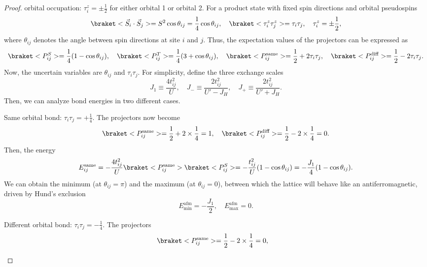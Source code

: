 \begin{solution}
\begin{enumext}[label = \Roman*.]
\begin{proof}
      orbital occupation: $\tau_i^z = \pm\frac12$ for either orbital 1 or
      orbital 2. For a product state with fixed spin directions and
      orbital pseudospins
      \[
        \braket<\vec S_i \cdot \vec S_j> = S^2 \cos\theta_{ij}
      = \frac14 \cos\theta_{ij}, \quad
        \braket<\tau_i^z \tau_j^z> = \tau_i \tau_j, \quad \tau_i^z = \pm\frac12,
      \]
      where $\theta_{ij}$ denotes the angle between spin directions at site $i$
      and $j$. Thus, the expectation values of the projectors can be
      expressed as
      \[
        \braket<P_{ij}^S> = \frac14(1 - \cos\theta_{ij}), \quad
        \braket<P_{ij}^T> = \frac14(3 + \cos\theta_{ij}), \quad
        \braket<P_{ij}^\text{same}> = \frac12 + 2\tau_i\tau_j,\quad
        \braket<P_{ij}^\text{diff}> = \frac12 - 2\tau_i\tau_j.
      \]
      Now, the uncertain variables are $\theta_{ij}$ and $\tau_i\tau_j$.
      For simplicity, define the three exchange scales
      \[
        J_1 \equiv \frac{4t_{ij}^2}{U}, \quad
        J_- \equiv \frac{2t_{ij}^2}{U' - J_H}, \quad
        J_+ \equiv \frac{2t_{ij}^2}{U' + J_H}.
      \]
      Then, we can analyze bond energies in two different cases.
      \begin{enumext}[label = (\alph*)]
        \item Same orbital bond: $\tau_i \tau_j = +\frac14$. The projectors
        now become
        \[
          \braket<P_{ij}^\text{same}> = \frac12 + 2 \times \frac14 = 1, \quad
          \braket<P_{ij}^\text{diff}> = \frac12 - 2 \times \frac14 = 0.
        \]
        Then, the energy
        \[
          E_{ij}^\text{same} = -\frac{4t_{ij}^2}{U}
          \braket<P_{ij}^\text{same}> \braket<P_{ij}^S>
        = -\frac{t_{ij}^2}{U} (1 - \cos\theta_{ij})
        = -\frac{J_1}{4} (1 - \cos\theta_{ij}).
        \]
        We can obtain the minimum (at $\theta_{ij} = \pi$) and
        the maximum (at $\theta_{ij} = 0$), between which the lattice will
        behave like an antiferromagnetic, driven by Hund's exclusion
        \begin{equation}
          E_{\min}^\text{afm} = -\frac{J_1}{2}, \quad
          E_{\max}^\text{afm} = 0. \tag*{
          \textuparrow \textdownarrow \textuparrow \textdownarrow
          \textuparrow \textdownarrow \textuparrow \textdownarrow
          \textuparrow \textdownarrow \textuparrow \textdownarrow}
        \end{equation}
        \item Different orbital bond: $\tau_i \tau_j = -\frac14$. The
        projectors
        \[
          \braket<P_{ij}^\text{same}> = \frac12 - 2 \times \frac14 = 0, \quad
\]
\end{enumext}
\end{proof}
\end{enumext}
\end{solution}

